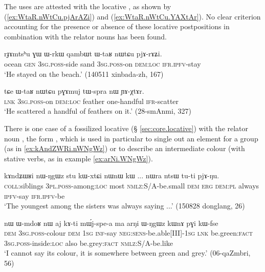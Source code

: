 The uses are attested with the locative , as shown by (\ref{ex:WtaR.nWtCu.pjArAZi}) and (\ref{ex:WtaR.nWtCu.YAXtAr}). No clear criterion accounting for the presence or absence of these locative postpositions in combination with the relator nouns has been found.

\begin{exe}
\ex \label{ex:WtaR.nWtCu.pjArAZi}
\gll  rɟɤmtsʰu ɣɯ ɯ-rkɯ qambɯt ɯ-taʁ nɯtɕu pjɤ-rɤʑi. \\
ocean \textsc{gen} \textsc{3sg}.\textsc{poss}-side sand \textsc{3sg}.\textsc{poss}-on \textsc{dem}:\textsc{loc} \textsc{ifr}.\textsc{ipfv}-stay \\
\glt `He stayed on the beach.' (140511 xinbada-zh, 167)
\end{exe}

\begin{exe}
\ex \label{ex:WtaR.nWtCu.YAXtAr}
\gll tɕe ɯ-taʁ nɯtɕu pɣɤmuj tɯ-spra nɯ ɲɤ-χtɤr. \\
\textsc{lnk} \textsc{3sg}.\textsc{poss}-on \textsc{dem}:\textsc{loc} feather one-handful \textsc{ifr}-scatter \\
\glt `He scattered a handful of feathers on it.' (28-smAnmi, 327)
\end{exe}

There is one case of a fossilized  locative (§ \ref{sec:core.locative}) with the relator noun , the form , which is used in particular to single out an element for a group (as in \ref{ex:kAndZWRi.nWNgWz}) or to describe an intermediate colour (with stative verbs, as in example \ref{ex:arNi.WNgWz}).

\begin{exe}
\ex \label{ex:kAndZWRi.nWNgWz} 
\gll kɤndʑɯʁi nɯ-ŋgɯz stu kɯ-xtɕi nɯnɯ kɯ ... nɯra ntsɯ tu-ti pjɤ-ŋu. \\
\textsc{coll}:siblings \textsc{3pl}.\textsc{poss}-among:\textsc{loc} most \textsc{nmlz}:S/A-be.small \textsc{dem} \textsc{erg} { } \textsc{dem}:\textsc{pl} always \textsc{ipfv}-say \textsc{ifr}.\textsc{ipfv}-be \\
\glt `The youngest among the sisters was always saying ...' (150828 donglang, 26)
  \end{exe}
  
  \begin{exe}
\ex \label{ex:arNi.WNgWz} 
\gll nɯ ɯ-mdoʁ nɯ aj kɤ-ti mɯ́j-spe-a ma arŋi ɯ-ŋgɯz kɯnɤ pɣi kɯ-fse   \\
\textsc{dem} \textsc{3sg}.\textsc{poss}-colour \textsc{dem} \textsc{1sg} \textsc{inf}-say \textsc{neg}:\textsc{sens}-be.able[III]-\textsc{1sg} \textsc{lnk} be.green:\textsc{fact} \textsc{3sg}.\textsc{poss}-inside:\textsc{loc} also be.grey:\textsc{fact} \textsc{nmlz}:S/A-be.like \\
\glt `I cannot say its colour, it is somewhere between green and grey.' (06-qaZmbri, 56)
    \end{exe}
    
